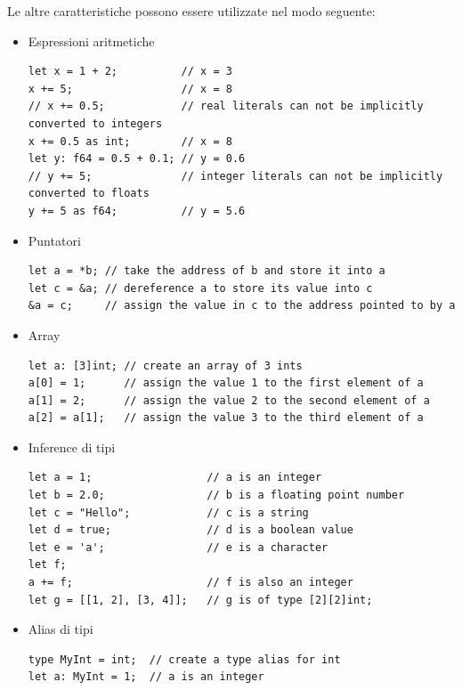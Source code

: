 \documentclass[a4paper]{article}
\begin{document}
Le altre caratteristiche possono essere utilizzate nel modo seguente:
\begin{itemize}
\item Espressioni aritmetiche 
\begin{verbatim}
let x = 1 + 2;          // x = 3
x += 5;                 // x = 8
// x += 0.5;            // real literals can not be implicitly converted to integers
x += 0.5 as int;        // x = 8
let y: f64 = 0.5 + 0.1; // y = 0.6
// y += 5;              // integer literals can not be implicitly converted to floats
y += 5 as f64;          // y = 5.6
\end{verbatim}

\item Puntatori
\begin{verbatim}
let a = *b; // take the address of b and store it into a
let c = &a; // dereference a to store its value into c
&a = c;     // assign the value in c to the address pointed to by a
\end{verbatim}

\item Array
\begin{verbatim}
let a: [3]int; // create an array of 3 ints
a[0] = 1;      // assign the value 1 to the first element of a
a[1] = 2;      // assign the value 2 to the second element of a
a[2] = a[1];   // assign the value 3 to the third element of a
\end{verbatim}

\item Inference di tipi
\begin{verbatim}
let a = 1;                  // a is an integer
let b = 2.0;                // b is a floating point number
let c = "Hello";            // c is a string
let d = true;               // d is a boolean value
let e = 'a';                // e is a character
let f;
a += f;                     // f is also an integer
let g = [[1, 2], [3, 4]];   // g is of type [2][2]int;
\end{verbatim}

\item Alias di tipi
\begin{verbatim}
type MyInt = int;  // create a type alias for int
let a: MyInt = 1;  // a is an integer
\end{verbatim}
\end{itemize}
\end{document}
